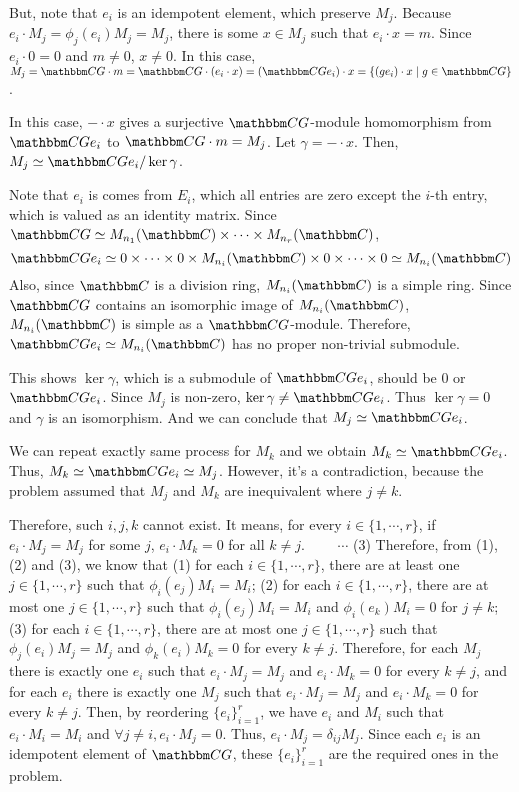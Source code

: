 But, note that \(e_i\) is an idempotent element, which preserve \(M_j\).
Because \(e_i \cdot M_j = \phi_j(e_i) M_j = M_j\),
there is some \(x \in M_j\) such that \(e_i \cdot x = m\).
Since \(e_i \cdot 0 = 0\) and \(m \neq 0\), \(x \neq 0\).
In this case,
\(M_j = \bbC G \cdot m = \bbC G \cdot (e_i \cdot x) = (\bbC G  e_i) \cdot x
= \{(g e_i) \cdot x \mid g \in \bbC G \}\).

In this case, \(- \cdot x\) gives a surjective \(\bbC G\)-module homomorphism
from \(\bbC G e_i\)
to \(\bbC G \cdot m = M_j\).
Let \(\gamma = - \cdot x\).
Then, \(M_j \simeq \bbC G e_i / \ker \gamma\).

Note that \(e_i\) is comes from \(E_i\), which all entries are zero
except the \(i\)-th entry, which is valued as an identity matrix.
Since \(\bbC G \simeq M_{n_1}(\bbC) \times \cdots \times M_{n_r}(\bbC)\),
\[\bbC G e_i \simeq 0 \times \cdots \times 0 \times M_{n_i}(\bbC) \times 0 \times \cdots \times 0 \simeq M_{n_i}(\bbC)\]
Also, since \(\bbC\) is a division ring,
\(M_{n_i}(\bbC)\) is a simple ring.
Since \(\bbC G\) contains an isomorphic image of \(M_{n_i}(\bbC)\),
\(M_{n_i}(\bbC)\) is simple as a \(\bbC G\)-module.
Therefore, \(\bbC G e_i \simeq M_{n_i}(\bbC)\)
has no proper non-trivial submodule.

This shows \(\ker \gamma\),
which is a submodule of \(\bbC G e_i\),
should be \(0\) or \(\bbC G e_i\).
Since \(M_j\) is non-zero, \(\ker \gamma \neq \bbC G e_i\).
Thus \(\ker \gamma = 0\) and \(\gamma\) is an isomorphism.
And we can conclude that \(M_j \simeq \bbC G e_i\).

We can repeat exactly same process for \(M_k\) and we obtain
\(M_k \simeq \bbC G e_i\).
Thus, \(M_k \simeq \bbC G e_i \simeq M_j\).
However, it's a contradiction, because the problem assumed that
\(M_j\) and \(M_k\) are inequivalent where \(j \neq k\).

Therefore, such \(i, j, k\) cannot exist.
It means, for every \(i \in \{1, \cdots, r\}\),
if \(e_i \cdot M_j = M_j\) for some \(j\),
\(e_i \cdot M_k = 0\) for all \(k \neq j\).
\(\qquad\cdots\) (3)
\br
\noindent
Therefore, from (1), (2) and (3),
we know that
(1) for each \(i \in \{1, \cdots, r\}\), there are at least one \(j \in \{1, \cdots, r\}\) such that \(\phi_i(e_j) M_i = M_i\);
(2) for each \(i \in \{1, \cdots, r\}\), there are at most one \(j \in \{1, \cdots, r\}\) such that \(\phi_i(e_j) M_i = M_i\) and \(\phi_i(e_k) M_i = 0\) for \(j \neq k\);
(3) for each \(i \in \{1, \cdots, r\}\), there are at most one \(j \in \{1, \cdots, r\}\) such that \(\phi_j(e_i) M_j = M_j\)  and \(\phi_k(e_i) M_k = 0\) for every \(k \neq j\).
Therefore, for each \(M_j\) there is exactly one \(e_i\) such that \(e_i \cdot M_j = M_j\) and \(e_i \cdot M_k = 0\) for every \(k \neq j\),
and for each \(e_i\) there is exactly one \(M_j\) such that \(e_i \cdot M_j = M_j\) and \(e_i \cdot M_k = 0\) for every \(k \neq j\).
Then, by reordering \(\{e_i\}_{i=1}^r\),
we have \(e_i\) and \(M_i\) such that
\(e_i \cdot M_i = M_i\)
and
\(\forall j \neq i, e_i \cdot M_j = 0\).
Thus,
\(e_i \cdot M_j = \delta_{ij} M_j\).
Since each \(e_i\) is an idempotent element of \(\bbC G\),
these \(\{e_i\}_{i=1}^r\) are the required ones in the problem.
\qedsq
